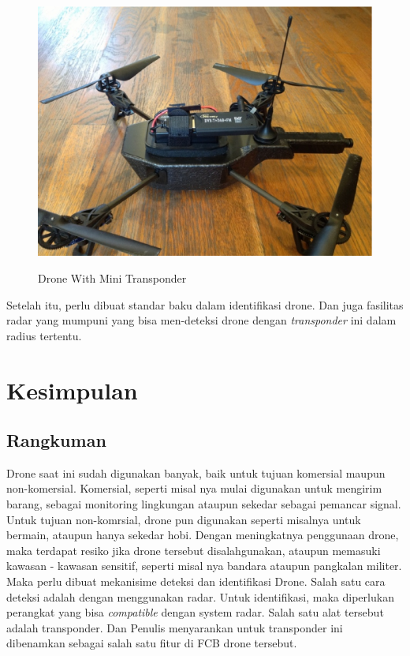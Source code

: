 \documentclass[9pt,twocolumn,twoside]{Gunadarma}
\begin{document}
\begin{figure}[htbp]
	\begin{center}
		\includegraphics[width=1\columnwidth]{DroneWithTransponder.eps} \label{fig:1-noFCase1}
	\end{center}
	\caption{Drone With Mini Transponder}
\end{figure}


Setelah itu, perlu dibuat standar baku dalam identifikasi drone. Dan juga fasilitas radar yang mumpuni yang bisa men-deteksi drone dengan \textit{transponder} ini dalam radius tertentu. 



\section{Kesimpulan}
\subsection{Rangkuman}

Drone saat ini sudah digunakan banyak, baik untuk tujuan komersial maupun non-komersial. Komersial, seperti misal nya mulai digunakan untuk mengirim barang, sebagai monitoring lingkungan ataupun sekedar sebagai pemancar signal. Untuk tujuan non-komrsial, drone pun digunakan seperti misalnya untuk bermain, ataupun hanya sekedar hobi. Dengan meningkatnya penggunaan drone, maka terdapat resiko jika drone tersebut disalahgunakan, ataupun memasuki kawasan - kawasan sensitif, seperti misal nya bandara ataupun pangkalan militer. Maka perlu dibuat mekanisime deteksi dan identifikasi Drone. Salah satu cara deteksi adalah dengan menggunakan radar. Untuk identifikasi, maka diperlukan perangkat yang bisa \textit{compatible} dengan system radar. Salah satu alat tersebut adalah transponder. Dan Penulis menyarankan untuk transponder ini dibenamkan sebagai salah satu fitur di FCB drone tersebut. 
\end{document}
